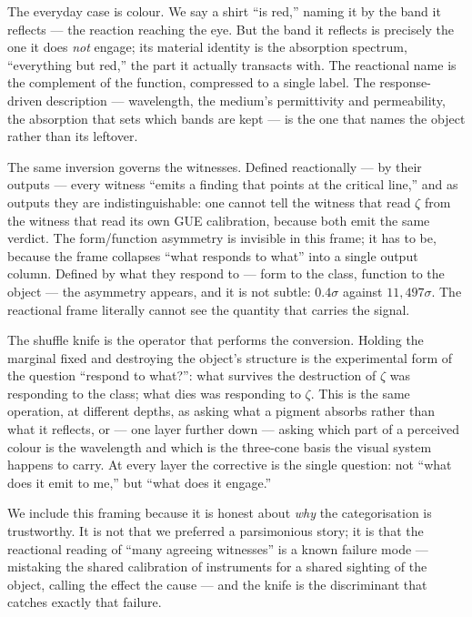 \documentclass[11pt]{article}
\begin{document}
The everyday case is colour. We say a shirt ``is red,'' naming it by the band it reflects --- the reaction reaching the eye. But the band it reflects is precisely the one it does \emph{not} engage; its material identity is the absorption spectrum, ``everything but red,'' the part it actually transacts with. The reactional name is the complement of the function, compressed to a single label. The response-driven description --- wavelength, the medium's permittivity and permeability, the absorption that sets which bands are kept --- is the one that names the object rather than its leftover.

The same inversion governs the witnesses. Defined reactionally --- by their outputs --- every witness ``emits a finding that points at the critical line,'' and as outputs they are indistinguishable: one cannot tell the witness that read $\zeta$ from the witness that read its own GUE calibration, because both emit the same verdict. The form/function asymmetry is invisible in this frame; it has to be, because the frame collapses ``what responds to what'' into a single output column. Defined by what they respond to --- form to the class, function to the object --- the asymmetry appears, and it is not subtle: $0.4\sigma$ against $11{,}497\sigma$. The reactional frame literally cannot see the quantity that carries the signal.

The shuffle knife is the operator that performs the conversion. Holding the marginal fixed and destroying the object's structure is the experimental form of the question ``respond to what?'': what survives the destruction of $\zeta$ was responding to the class; what dies was responding to $\zeta$. This is the same operation, at different depths, as asking what a pigment absorbs rather than what it reflects, or --- one layer further down --- asking which part of a perceived colour is the wavelength and which is the three-cone basis the visual system happens to carry. At every layer the corrective is the single question: not ``what does it emit to me,'' but ``what does it engage.''

We include this framing because it is honest about \emph{why} the categorisation is trustworthy. It is not that we preferred a parsimonious story; it is that the reactional reading of ``many agreeing witnesses'' is a known failure mode --- mistaking the shared calibration of instruments for a shared sighting of the object, calling the effect the cause --- and the knife is the discriminant that catches exactly that failure.
\end{document}
